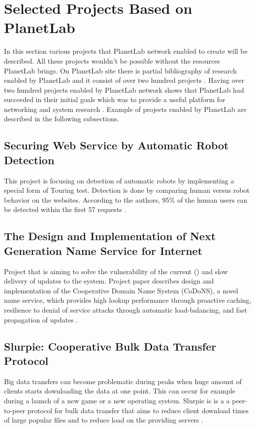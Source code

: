 \section{Selected Projects Based on PlanetLab}
In this section various projects that PlanetLab network enabled to create will be described. All these projects wouldn't be possible without the resources PlanetLab brings. On PlanetLab site there is partial bibliography of research enabled by PlanetLab and it consist of over two hundred projects \cite{planetlabmain}. Having over two hundred projects enabled by PlanetLab network shows that PlanetLab had succeeded in their initial goals which was to provide a useful platform for networking and system research \cite{Roscoe_PDN-02-002}. Example of projects enabled by PlanetLab are described in the following subsections.
\subsection{Securing Web Service by Automatic Robot Detection}
This project is focusing on detection of automatic robots by implementing a special form of Touring test. Detection is done by comparing human versus robot behavior on the websites. According to the authors, 95\% of the human users can be detected within the first 57 requests \cite{Park:2006:SWS:1267359.1267382}.
\subsection{The Design and Implementation of Next Generation Name Service for Internet}
Project that is aiming to solve the vulnerability of the current  () and slow delivery of updates to the system. Project paper describes design and implementation of the Cooperative Domain Name System (CoDoNS), a novel name service, which provides high lookup performance through proactive caching, resilience to denial of service attacks through automatic load-balancing, and fast propagation of updates \cite{Ramasubramanian:2004:DIN:1030194.1015504}.
\subsection{Slurpie: Cooperative Bulk Data Transfer Protocol}
Big data transfers can become problematic during peaks when huge amount of clients starts downloading the data at one point. This can occur for example during a launch of a new game or a new operating system. Slurpie is is a  a peer-to-peer protocol for bulk data transfer that aims to reduce client download times of large popular files and to reduce load on the providing servers \cite{1356981}. 

